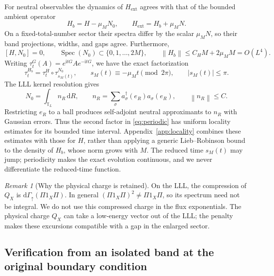 \documentclass[11pt]{article}
\theoremstyle{definition}
\theoremstyle{remark}
\newtheorem{remark}[theorem]{Remark}
\newcommand{\ii}{\mathrm i}
\newcommand{\dd}{\,\mathrm d}
\newcommand{\Spec}{\operatorname{Spec}}
\newcommand{\dG}{\mathrm d\Gamma}
\newcommand{\TT}{\mathbb T}
\newcommand{\up}{\uparrow}
\newcommand{\norm}[1]{\left\lVert#1\right\rVert}
\begin{document}
For neutral observables the dynamics of \(H_{\mathrm{ext}}\)
agrees with that of the bounded ambient operator
\begin{equation}\label{eq:Hb}
 H_b=H-\mu_MN_0,\qquad H_{\mathrm{ext}}=H_b+\mu_MN.
\end{equation}
On a fixed-total-number sector their spectra differ by the scalar
\(\mu_MN\), so their band projections, widths, and gaps agree.
Furthermore,
\[
 [H,N_0]=0,\qquad \Spec(N_0)\subset\{0,1,\ldots,2M\},\qquad
 \norm{H_b}\le C_HM+2\mu_MM=O(L^4).
\]
Writing \(\tau_t^G(A)=e^{\ii tG}Ae^{-\ii tG}\), we have the
exact factorization
\begin{equation}\label{eq:periodic}
 \tau_t^{H_b}=\tau_t^H\circ\tau_{s_M(t)}^{N_0},\qquad
 s_M(t)\equiv-\mu_Mt\pmod{2\pi},\qquad |s_M(t)|\le\pi.
\end{equation}
The LLL kernel resolution gives
\[
 N_0=\int_{\TT_L}n_R\dd R,\qquad
 n_R=\sum_\sigma a_\sigma^\dagger(e_R)a_\sigma(e_R),\qquad
 \norm{n_R}\le C.
\]
Restricting \(e_R\) to a ball produces self-adjoint neutral
approximants to \(n_R\) with Gaussian errors.  Thus the second
factor in \eqref{eq:periodic} has uniform locality estimates for
its bounded time interval.  Appendix~\ref{app:locality} combines
these estimates with those for \(H\), rather than applying a
generic Lieb--Robinson bound to the density of \(H_b\), whose
norm grows with \(M\).  The reduced time \(s_M(t)\) may jump;
periodicity makes the exact evolution continuous, and we never
differentiate the reduced-time function.

\begin{remark}[Why the physical charge is retained]
On the LLL, the compression of \(Q_X\) is
\(\dG_\up(\Pi1_X\Pi)\).  In general \((\Pi1_X\Pi)^2\ne\Pi1_X\Pi\),
so its spectrum need not be integral.  We do not use this compressed
charge in the flux exponentials.  The physical charge \(Q_X\)
can take a low-energy vector out of the LLL; the penalty makes
these excursions compatible with a gap in the enlarged sector.
\end{remark}

\subsection{Verification from an isolated band at the original boundary condition}
\end{document}
